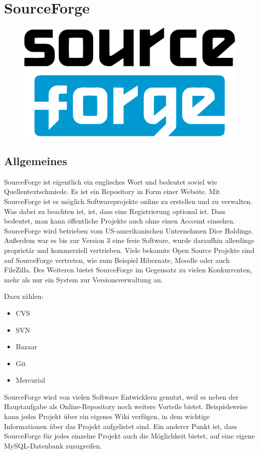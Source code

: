 


\section{SourceForge}

\begin{figure}[h]
\centering
\includegraphics[width=0.5\linewidth]{sourceforge-logo}
\end{figure}

\subsection{Allgemeines}

SourceForge ist eigentlich ein englisches Wort und bedeutet soviel wie \glqq Quellentextschmiede\grqq. Es ist ein Repository in Form einer Website. Mit SourceForge ist es möglich Softwareprojekte online zu erstellen und zu verwalten. Was dabei zu beachten ist, ist, dass eine Registrierung optional ist. Dass bedeutet, man kann öffentliche Projekte auch ohne einen Account einsehen. SourceForge wird betrieben vom US-amerikanischen Unternehmen \glqq Dice Holdings\grqq. Au{\ss}erdem war es bis zur Version 3 eine freie Software, wurde daraufhin allerdings proprietär und kommerziell vertrieben. Viele bekannte Open Source Projekte sind auf SourceForge vertreten, wie zum Beispiel Hibernate, Moodle oder auch FileZilla. Des Weiteren bietet SourceForge im Gegensatz zu vielen Konkurrenten, mehr als nur ein System zur Versionsverwaltung an. 

Dazu zählen: 
\begin{itemize}
	\item CVS
	\item SVN
	\item Bazaar
	\item Git
	\item Mercurial
\end{itemize}
\noindent
SourceForge wird von vielen Software Entwicklern genutzt, weil es neben der Hauptaufgabe als Online-Repository noch weitere Vorteile bietet. Beispielsweise kann jedes Projekt über ein eigenes Wiki verfügen, in dem wichtige Informationen über das Projekt aufgelistet sind. Ein anderer Punkt ist, dass SourceForge für jedes einzelne Projekt auch die Möglichkeit bietet, auf eine eigene MySQL-Datenbank zuzugreifen.

